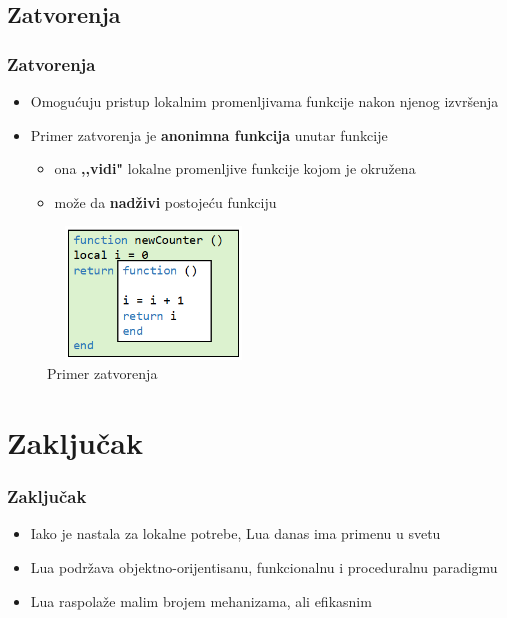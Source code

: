 \documentclass{beamer}
\begin{document}
\subsection{Zatvorenja}
\begin{frame}
\frametitle{Zatvorenja}
\begin{itemize}
\item Omogućuju pristup lokalnim promenljivama funkcije nakon njenog izvršenja
\item Primer zatvorenja je \textbf{anonimna funkcija} unutar funkcije
\begin{itemize}
\item ona \textbf{,,vidi"} lokalne promenljive funkcije kojom je okružena
\item može da \textbf{nadživi} postojeću funkciju
\end{itemize}
\end{itemize}

\begin{figure}
\includegraphics[scale=2.98, width=160pt, height=100pt]{zatvorenje.png}
\caption{Primer zatvorenja}
\end{figure}


\end{frame}



\section{Zaključak}

\begin{frame}
\frametitle{Zaključak}

\begin{itemize}
\item Iako je nastala za lokalne potrebe, Lua danas ima primenu u svetu
\item Lua podržava objektno-orijentisanu, funkcionalnu i proceduralnu paradigmu
\item Lua raspolaže malim brojem mehanizama, ali efikasnim
\end{itemize}

\end{frame}
\end{document}
